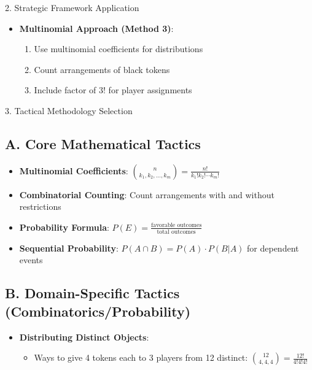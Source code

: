 \documentclass[12pt]{article}
\begin{document}
\begin{strategybox}{2. Strategic Framework Application}
\begin{itemize}[leftmargin=*]
    \item \textbf{Multinomial Approach (Method 3)}:
    \begin{enumerate}
        \item Use multinomial coefficients for distributions
        \item Count arrangements of black tokens
        \item Include factor of $3!$ for player assignments
    \end{enumerate}
\end{itemize}

\end{strategybox}

\begin{tacticsbox}{3. Tactical Methodology Selection}

\subsection*{A. Core Mathematical Tactics}
\begin{itemize}[leftmargin=*]
    \item \textbf{Multinomial Coefficients}: $\binom{n}{k_1, k_2, \ldots, k_m} = \frac{n!}{k_1! k_2! \cdots k_m!}$
    
    \item \textbf{Combinatorial Counting}: Count arrangements with and without restrictions
    
    \item \textbf{Probability Formula}: $P(E) = \frac{\text{favorable outcomes}}{\text{total outcomes}}$
    
    \item \textbf{Sequential Probability}: $P(A \cap B) = P(A) \cdot P(B|A)$ for dependent events
\end{itemize}

\subsection*{B. Domain-Specific Tactics (Combinatorics/Probability)}
\begin{itemize}[leftmargin=*]
    \item \textbf{Distributing Distinct Objects}: 
    \begin{itemize}
        \item Ways to give 4 tokens each to 3 players from 12 distinct: $\binom{12}{4,4,4} = \frac{12!}{4!4!4!}$
    \end{itemize}
    

\end{itemize}
\end{tacticsbox}
\end{document}

